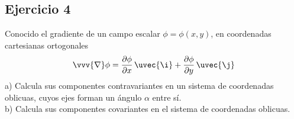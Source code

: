 %
%
%
%


\newpage
\subsection{Ejercicio 4}
Conocido el gradiente de un campo escalar $\phi=\phi(x,y)$, en coordenadas cartesianas ortogonales
\[
  \vvv{\nabla}\phi
  = \dfrac{\partial\phi}{\partial x}\,\uvec{\i}
  + \dfrac{\partial\phi}{\partial y}\,\uvec{\j}
\]
\noindent
a) Calcula sus componentes contravariantes en un sistema de coordenadas oblicuas, cuyos
ejes forman un ángulo $\alpha$ entre sí.\\
b) Calcula sus componentes covariantes en el sistema de coordenadas oblicuas.\\

